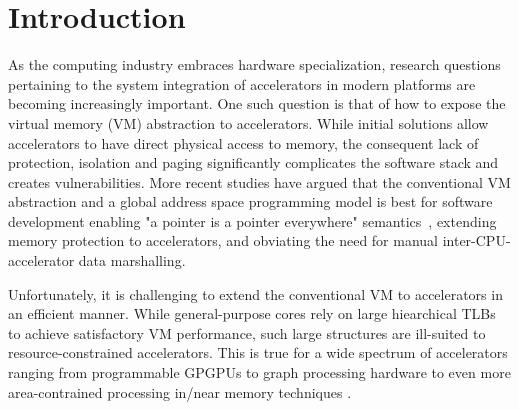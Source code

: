 \section{Introduction}
\label{sec:intro}
As the computing industry embraces hardware specialization, research
questions pertaining to the system integration of accelerators in
modern platforms are becoming increasingly important. One such
question is that of how to expose the virtual memory (VM) abstraction
to accelerators. While initial solutions allow accelerators to have
direct physical access to memory, the consequent lack of protection,
isolation and paging significantly complicates the software
stack and creates vulnerabilities. More recent studies have argued that the conventional VM
abstraction and a global address space programming model is best for
software development enabling "a pointer is a pointer everywhere"
semantics~\cite{pichai:architectural, power:supporting,
  haria:devirtualizing, vesely:observation, ausavarungnirun:mosaic},
extending memory protection to accelerators, and obviating the need
for manual inter-CPU-accelerator data marshalling.

Unfortunately, it is challenging to extend the conventional VM to
accelerators in an efficient manner. While general-purpose cores rely
on large hiearchical TLBs to achieve satisfactory VM performance, 
such large structures are ill-suited to resource-constrained 
accelerators. This is true for a wide spectrum of
accelerators ranging from programmable GPGPUs
\cite{pichai:architectural, power:supporting} to graph processing
hardware \cite{haria:devirtualizing} to even more area-contrained
processing in/near memory techniques \cite{picorel:near-memory}.

